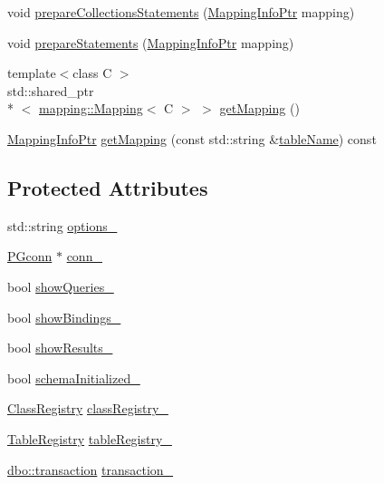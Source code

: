 \begin{DoxyCompactItemize}
\item 
void \hyperlink{classdbo_1_1connection_a3a73f471795ea5dee870f5ee3b51c1b6}{prepare\+Collections\+Statements} (\hyperlink{classdbo_1_1connection_acca03a784c87ffb1ec7bdf33f526dff5}{Mapping\+Info\+Ptr} mapping)
\item 
void \hyperlink{classdbo_1_1connection_a1c878e83c11f7f524920620e692cb61f}{prepare\+Statements} (\hyperlink{classdbo_1_1connection_acca03a784c87ffb1ec7bdf33f526dff5}{Mapping\+Info\+Ptr} mapping)
\item 
{\footnotesize template$<$class C $>$ }\\std\+::shared\+\_\+ptr\\*
$<$ \hyperlink{classdbo_1_1mapping_1_1_mapping}{mapping\+::\+Mapping}$<$ C $>$ $>$ \hyperlink{classdbo_1_1connection_ad29f174ef8539b4e3ae60c91a293adf8}{get\+Mapping} ()
\item 
\hyperlink{classdbo_1_1connection_acca03a784c87ffb1ec7bdf33f526dff5}{Mapping\+Info\+Ptr} \hyperlink{classdbo_1_1connection_a94500555db4f80aef65861c5ff9e6c10}{get\+Mapping} (const std\+::string \&\hyperlink{classdbo_1_1connection_ade1cbdc41769464cd1076e09c2099c9a}{table\+Name}) const 
\end{DoxyCompactItemize}
\subsection*{Protected Attributes}
\begin{DoxyCompactItemize}
\item 
std\+::string \hyperlink{classdbo_1_1connection_ab03d3dced341bf89b5cecdd645fff3d4}{options\+\_\+}
\item 
\hyperlink{connection_8h_a5ed62e34058025c39959695e724603a6}{P\+Gconn} $\ast$ \hyperlink{classdbo_1_1connection_a5bea8990337d86b92b274004a94288b4}{conn\+\_\+}
\item 
bool \hyperlink{classdbo_1_1connection_a38caab3883d4d165d0ef7fc81791dd95}{show\+Queries\+\_\+}
\item 
bool \hyperlink{classdbo_1_1connection_a1b14e416f52aed1aa46b9600bdd8c466}{show\+Bindings\+\_\+}
\item 
bool \hyperlink{classdbo_1_1connection_afdcf9d15e645a452153699e6833ea59f}{show\+Results\+\_\+}
\item 
bool \hyperlink{classdbo_1_1connection_aceadf42379584e3736187409857cff8f}{schema\+Initialized\+\_\+}
\item 
\hyperlink{classdbo_1_1connection_adecb3694055470fb13f96185f3804e4e}{Class\+Registry} \hyperlink{classdbo_1_1connection_a9dae61c756636fa11ad66de2b02d05aa}{class\+Registry\+\_\+}
\item 
\hyperlink{classdbo_1_1connection_ac58484f4b88dbc57cbd1f63471aa456d}{Table\+Registry} \hyperlink{classdbo_1_1connection_a9b17470dcf5f38ca668bd01852db2a52}{table\+Registry\+\_\+}
\item 
\hyperlink{classdbo_1_1transaction}{dbo\+::transaction} \hyperlink{classdbo_1_1connection_a7d822f46486566b7e6b310a581e6a148}{transaction\+\_\+}
\end{DoxyCompactItemize}
